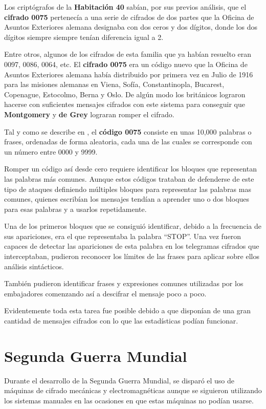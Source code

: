 \documentclass[nochap]{apuntesURJC}
\begin{document}
Los criptógrafos de la \textbf{Habitación 40} sabían, por sus previos análisis, que el \textbf{cifrado 0075} pertenecía a una serie de cifrados de dos partes que la Oficina de Asuntos Exteriores alemana designaba con dos ceros y dos dígitos, donde los dos dígitos siempre siempre tenían diferencia igual a 2.

Entre otros, algunos de los cifrados de esta familia que ya habían resuelto eran 0097, 0086, 0064, etc. El \textbf{cifrado 0075} era un código nuevo que la Oficina de Asuntos Exteriores alemana había distribuido por primera vez en Julio de 1916 para las misiones alemanas en Viena, Sofía, Constantinopla, Bucarest, Copenague, Estocolmo, Berna y Oslo. De algún modo los británicos lograron hacerse con suficientes mensajes cifrados con este sistema para conseguir que \textbf{Montgomery} y \textbf{de Grey} lograran romper el cifrado.

Tal y como se describe en \cite{Book:TelegraphDiplomacy}, el \textbf{código 0075} consiste en unas 10,000 palabras o frases, ordenadas de forma aleatoria, cada una de las cuales se corresponde con un número entre 0000 y 9999.

Romper un código así desde cero requiere identificar los bloques que representan las palabras más comunes. Aunque estos códigos trataban de defenderse de este tipo de ataques definiendo múltiples bloques para representar las palabras mas comunes, quienes escribían los mensajes tendían a aprender uno o dos bloques para esas palabras y a usarlos repetidamente.

Una de los primeros bloques que se consiguió identificar, debido a la frecuencia de sus apariciones, era el que representaba la palabra ``STOP''. Una vez fueron capaces de detectar las apariciones de esta palabra en los telegramas cifrados que interceptaban, pudieron reconocer los límites de las frases para aplicar sobre ellos análisis sintácticos.

También pudieron identificar frases y expresiones comunes utilizadas por los embajadores comenzando así a descifrar el mensaje poco a poco.

Evidentemente toda esta tarea fue posible debido a que disponían de una gran cantidad de mensajes cifrados con lo que las estadísticas podían funcionar.

\section{Segunda Guerra Mundial}
Durante el desarrollo de la Segunda Guerra Mundial, se disparó el uso de máquinas de cifrado mecánicas y electromagnéticas aunque se siguieron utilizando los sistemas manuales en las ocasiones en que estas máquinas no podían usarse.
\end{document}

